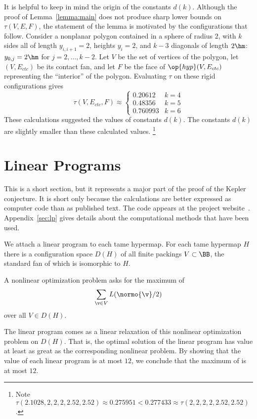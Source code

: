 \begin{remark}
  It is helpful to keep in mind the origin of the constants $d(k)$.
  Although the proof of Lemma~\ref{lemma:main} does not produce sharp
  lower bounds on $\tau(V,E,F)$, the statement of the lemma is
  motivated by the configurations that follow.  Consider a nonplanar
  polygon contained in a sphere of radius $2$, with $k$ sides all of
  length $y_{i,i+1}=2$, heights $y_i=2$, and $k-3$ diagonals of length
  $2\hm$: $y_{0,j}=2\hm$ for $j=2,\ldots,k-2$.  Let $V$ be the set of
  vertices of the polygon, let $(V,E_{ctc})$ be its contact fan, and
  let $F$ be the face of $\op{hyp}(V,E_{ctc})$ representing the
  ``interior'' of the polygon.  Evaluating $\tau$ on these rigid
  configurations gives
\[ 
\tau(V,E_{ctc},F) \approx
\begin{cases}
0.20612 & k=4\\
0.48356 & k=5\\
0.760993 &k=6
\end{cases}
\] 
These calculations suggested the values of constants $d(k)$.  The
constants $d(k)$ are slightly smaller than these calculated values.%
\footnote{Note $\tau(2.1028,2,2,2,2.52,2.52) \approx 0.275951 <
  0.277433 \approx \tau(2,2,2,2,2.52,2.52)$.}  %
%
%
\end{remark}


\section{Linear Programs}

This is a short section, but it represents a major part of the proof
of the Kepler conjecture.  It is short only because the calculations
are better expressed as computer code than as published text.  The
code appears at the project
website~\cite{website:FlyspeckProject}.  Appendix~\ref{sec:lp} gives
details about the computational methods that have been used.

We attach a linear program to each tame hypermap.  For each tame
hypermap $H$ there is a configuration space $D(H)$ of all finite
packings $V\subset \BB$,  the standard fan of which is isomorphic to $H$.
%
%

A nonlinear optimization problem asks for the maximum of
\begin{equation}\label{eqn:L2}
\sum_{\v\in V} L(\normo{\v}/2)
\end{equation}
over all $V\in D(H)$.

The linear program comes as a linear relaxation of this nonlinear
optimization problem on $D(H)$. That is, the optimal solution of the
linear program has value at least as great as the corresponding
nonlinear problem.  By showing that the value of each linear program
is at most $12$, we conclude that the maximum of  is at
most $12$.




